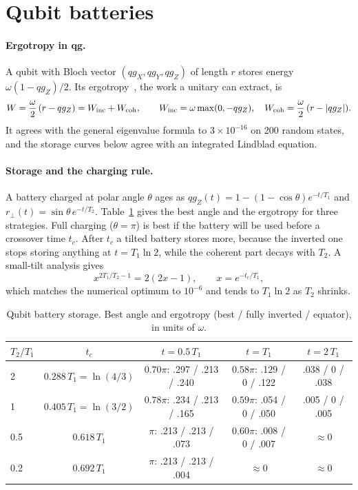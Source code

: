 \documentclass[11pt]{article}
\newcommand{\qgZ}{qg_Z}
\newcommand{\qgX}{qg_X}
\newcommand{\qgY}{qg_Y}
\begin{document}
\section{Qubit batteries}\label{sec:battery}

\paragraph{Ergotropy in qg.} A qubit with Bloch vector $(\qgX,\qgY,\qgZ)$ of length $r$ stores
energy $\omega(1-\qgZ)/2$. Its ergotropy~\cite{allahverdyan2004}, the work a unitary can extract, is
\begin{equation}\label{eq:ergo}
W=\frac{\omega}{2}\,(r-\qgZ)=W_{\rm inc}+W_{\rm coh},\qquad
W_{\rm inc}=\omega\max(0,-\qgZ),\quad W_{\rm coh}=\frac{\omega}{2}\,(r-|\qgZ|).
\end{equation}
It agrees with the general eigenvalue formula to $3\times10^{-16}$ on 200 random states, and the
storage curves below agree with an integrated Lindblad equation.

\paragraph{Storage and the charging rule.} A battery charged at polar angle $\theta$ ages as
$\qgZ(t)=1-(1-\cos\theta)e^{-t/T_1}$ and $r_\perp(t)=\sin\theta\,e^{-t/T_2}$.
Table~\ref{tab:battery} gives the best angle and the ergotropy for three strategies. Full charging
($\theta=\pi$) is best if the battery will be used before a crossover time $t_c$. After $t_c$ a tilted
battery stores more, because the inverted one stops storing anything at $t=T_1\ln2$, while the
coherent part decays with $T_2$. A small-tilt analysis gives
\begin{equation}\label{eq:tc}
x^{2T_1/T_2-1}=2(2x-1),\qquad x=e^{-t_c/T_1},
\end{equation}
which matches the numerical optimum to $10^{-6}$ and tends to $T_1\ln2$ as $T_2$ shrinks.

\begin{table}[t]
\centering\small
\caption{Qubit battery storage. Best angle and ergotropy (best / fully inverted / equator), in units
of $\omega$.}
\label{tab:battery}
\begin{tabular}{lcccc}
\toprule
$T_2/T_1$ & $t_c$ & $t=0.5\,T_1$ & $t=T_1$ & $t=2\,T_1$\\
\midrule
2 & $0.288\,T_1=\ln(4/3)$ & $0.70\pi$: .297 / .213 / .240 & $0.58\pi$: .129 / 0 / .122 & .038 / 0 / .038\\
1 & $0.405\,T_1=\ln(3/2)$ & $0.78\pi$: .234 / .213 / .165 & $0.59\pi$: .054 / 0 / .050 & .005 / 0 / .005\\
0.5 & $0.618\,T_1$ & $\pi$: .213 / .213 / .073 & $0.60\pi$: .008 / 0 / .007 & $\approx0$\\
0.2 & $0.692\,T_1$ & $\pi$: .213 / .213 / .004 & $\approx0$ & $\approx0$\\
\bottomrule
\end{tabular}
\end{table}
\end{document}
